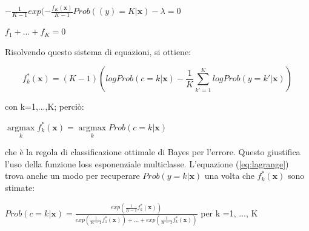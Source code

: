 \begin{center}
 \begin{math}
  -\frac{1}{K-1} exp (-\frac{f_K(\textbf{x})}{K-1} Prob((y)=K|\textbf{x}) -\lambda = 0
 \end{math}
\end{center}
\begin{center}
 \begin{math}
  f_1 + ... + f_K = 0
 \end{math}

\end{center}

Risolvendo questo sistema di equazioni, si ottiene:
\begin{center}
 \begin{equation}\label{eq:lagrange}
 f_k^*(\textbf{x}) = (K-1) (log Prob(c=k|\textbf{x}) - \frac{1}{K}\sum_{k'=1}^K log Prob(y=k'|\textbf{x}))
\end{equation}
\end{center}
con k=1,...,K; perci\`o:
\begin{center}
 \begin{math} \underset{k}{\operatorname{argmax}} f_k^*(\textbf{x}) = 
\underset{k}{\operatorname{argmax}}Prob(c=k|\textbf{x})
\end{math}
\end{center}
che \`e la regola di classificazione ottimale di Bayes per l'errore. Questo giustifica l'uso della 
funzione loss esponenziale multiclasse. L'equazione (\ref{eq:lagrange}) trova anche un modo per recuperare 
\begin{math}
 Prob( y = k | \textbf{x})
\end{math} una volta che \begin{math}
                          f^*_k(\textbf{x})
                         \end{math} sono stimate:
\begin{center}
 \begin{math}
  Prob( c = k | \textbf{x}) = \frac{exp(\frac{1}{K-1}f^*_k(\textbf{x}))}{exp(\frac{1}{K-1}f^*_1(\textbf{x}))+ ... + 
exp(\frac{1}{K-1}f^*_k(\textbf{x}))}
 \end{math}
 per k =1, ..., K
\end{center}


